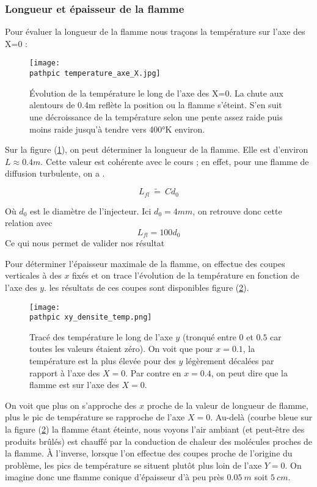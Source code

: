 \documentclass[a4paper,10pt]{article}
\newcommand\pathpic{/home/nsaura/Documents/new_doc/Latex_files/Pic/BE_combustion/}
\newcommand\darker{\color{Maroon}}
\newcommand\black{\color{black}}
\begin{document}
{\darker \subsubsection*{Longueur et épaisseur de la flamme} \black
Pour évaluer la longueur de la flamme nous traçons la température sur l'axe des X=0 : 

\begin{figure}[ht!]
\centering
\texttt{[image: \\pathpic temperature\_axe\_X.jpg]}
\caption{Évolution de la température le long de l'axe des X=0. La chute aux alentours de 0.4m reflète la position ou la flamme s'éteint. S'en suit une décroissance de la température selon une pente assez raide puis moins raide jusqu'à tendre vers 400°K environ.}
\label{temp_x0}
\end{figure}

\noindent Sur la figure (\ref{temp_x0}), on peut déterminer la longueur de la flamme. Elle est d'environ $L \approx 0.4 m$. Cette valeur est cohérente avec le cours ; en effet, pour une flamme de diffusion turbulente, on a .

\begin{equation}
L_{fl} \ \tilde{=} \ Cd_0
\label{loi_longueurflamme}
\end{equation}

\noindent Où $d_0$ est le diamètre de l'injecteur. Ici $d_0 = 4 mm$, on retrouve donc cette relation avec $$ L_{fl} = 100 d_0$$ Ce qui nous permet de valider nos résultat
\pagebreak

Pour déterminer l'épaisseur maximale de la flamme, on effectue des coupes verticales à des $x$ fixés et on trace l'évolution de la température en fonction de l'axe des $y$. les résultats de ces coupes sont disponibles figure (\ref{densite_temperature}).
\begin{figure}[ht!]
\centering
\texttt{[image: \\pathpic xy\_densite\_temp.png]}
\caption{Tracé des température le long de l'axe $y$ (tronqué entre $0$ et $0.5$ car toutes les valeurs étaient zéro). On voit que pour $x=0.1$, la température est la plus élevée pour des $y$ légèrement décalées par rapport à l'axe des $X = 0$. Par contre en $x=0.4$, on peut dire que la flamme est sur l'axe des $X=0$.}
\label{densite_temperature}
\end{figure}

On voit que plus on s'approche des $x$ proche de la valeur de longueur de flamme, plus le pic de température se rapproche de l'axe $X=0$. Au-delà (courbe bleue sur la figure (\ref{densite_temperature}) la flamme étant éteinte, nous voyons l'air ambiant (et peut-être des produits brûlés) est chauffé par la conduction de chaleur des molécules proches de la flamme. À l'inverse, lorsque l'on effectue des coupes proche de l'origine du problème, les pics de température se situent plutôt plus loin de l'axe $Y=0$. On imagine donc une flamme conique d'épaisseur d'à peu près $0.05 \ m$ soit $5 \ cm$.

}
\end{document}
